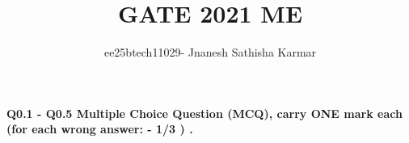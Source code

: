 \documentclass[journal]{IEEEtran}
\begin{document}

\vspace{3cm}


\title{GATE 2021 ME }
\author{ee25btech11029- Jnanesh Sathisha Karmar}
\maketitle
{\let\newpage\relax\maketitle}

\renewcommand{\thefigure}{\theenumi}
\renewcommand{\thetable}{\theenumi}
\setlength{\intextsep}{10pt} %
\textbf{Q0.1 - Q0.5 Multiple Choice Question (MCQ), carry ONE mark each (for each wrong answer: - 1/3 ) .}
\end{document}
